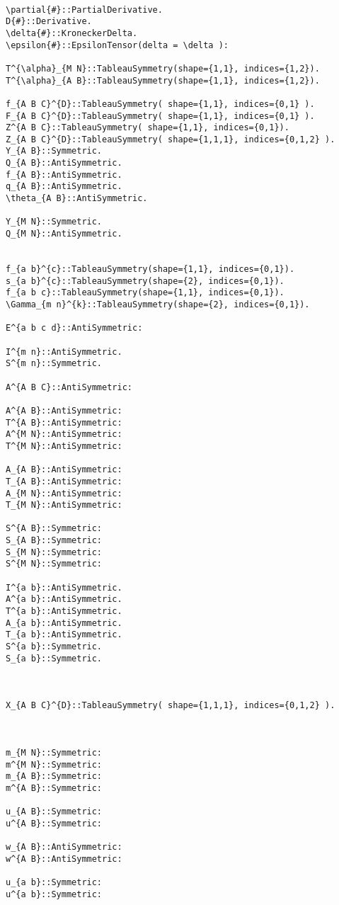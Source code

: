 \documentclass[11pt]{article}
\begin{document}
\\
{\color[named]{Blue}\begin{verbatim}
\partial{#}::PartialDerivative.
D{#}::Derivative.
\delta{#}::KroneckerDelta.
\epsilon{#}::EpsilonTensor(delta = \delta ):

T^{\alpha}_{M N}::TableauSymmetry(shape={1,1}, indices={1,2}).
T^{\alpha}_{A B}::TableauSymmetry(shape={1,1}, indices={1,2}).

f_{A B C}^{D}::TableauSymmetry( shape={1,1}, indices={0,1} ).  
F_{A B C}^{D}::TableauSymmetry( shape={1,1}, indices={0,1} ).  
Z^{A B C}::TableauSymmetry( shape={1,1}, indices={0,1}). 
Z_{A B C}^{D}::TableauSymmetry( shape={1,1,1}, indices={0,1,2} ).  
Y_{A B}::Symmetric.
Q_{A B}::AntiSymmetric.
f_{A B}::AntiSymmetric.
q_{A B}::AntiSymmetric.
\theta_{A B}::AntiSymmetric.

Y_{M N}::Symmetric.
Q_{M N}::AntiSymmetric.


f_{a b}^{c}::TableauSymmetry(shape={1,1}, indices={0,1}).
s_{a b}^{c}::TableauSymmetry(shape={2}, indices={0,1}).
f_{a b c}::TableauSymmetry(shape={1,1}, indices={0,1}).
\Gamma_{m n}^{k}::TableauSymmetry(shape={2}, indices={0,1}).

E^{a b c d}::AntiSymmetric:

I^{m n}::AntiSymmetric.
S^{m n}::Symmetric.

A^{A B C}::AntiSymmetric:

A^{A B}::AntiSymmetric:
T^{A B}::AntiSymmetric:
A^{M N}::AntiSymmetric:
T^{M N}::AntiSymmetric:

A_{A B}::AntiSymmetric:
T_{A B}::AntiSymmetric:
A_{M N}::AntiSymmetric:
T_{M N}::AntiSymmetric:

S^{A B}::Symmetric:
S_{A B}::Symmetric:
S_{M N}::Symmetric:
S^{M N}::Symmetric:

I^{a b}::AntiSymmetric.
A^{a b}::AntiSymmetric.
T^{a b}::AntiSymmetric.
A_{a b}::AntiSymmetric.
T_{a b}::AntiSymmetric.
S^{a b}::Symmetric.
S_{a b}::Symmetric.



X_{A B C}^{D}::TableauSymmetry( shape={1,1,1}, indices={0,1,2} ).  



m_{M N}::Symmetric:
m^{M N}::Symmetric:
m_{A B}::Symmetric:
m^{A B}::Symmetric:

u_{A B}::Symmetric:
u^{A B}::Symmetric:

w_{A B}::AntiSymmetric:
w^{A B}::AntiSymmetric:

u_{a b}::Symmetric:
u^{a b}::Symmetric:


\end{verbatim}}
\end{document}
